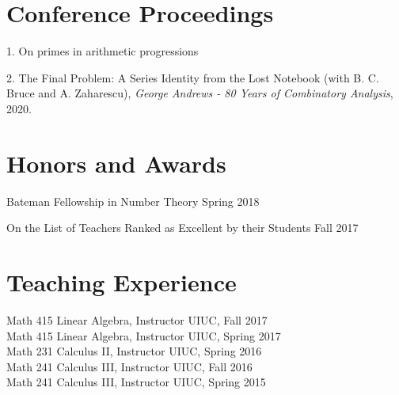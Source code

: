 \documentclass[margin,line,pifont,palatino,courier]{res}
\begin{document}
\begin{resume}
\section{\sc Conference Proceedings}
1. {On primes in arithmetic progressions}

2. {The Final Problem: A Series Identity from the Lost Notebook} (with B. C. Bruce and A. Zaharescu), {\it George Andrews - 80 Years of Combinatory Analysis}, 2020.

 
 







\section{\sc Honors and Awards}


{Bateman Fellowship in Number Theory} \hfill{Spring 2018}


{On the List of Teachers Ranked as Excellent by their Students} \hfill{Fall 2017}

%
%
%
%
%
%
%


\section{\sc Teaching Experience}
Math 415 Linear Algebra, Instructor {\hfill  UIUC, Fall 2017}\\
Math 415 Linear Algebra, Instructor {\hfill  UIUC, Spring 2017}\\
Math 231 Calculus II, Instructor {\hfill  UIUC, Spring 2016}\\
Math 241 Calculus III, Instructor {\hfill  UIUC, Fall 2016} \\
Math 241 Calculus III, Instructor {\hfill  UIUC, Spring 2015}



\end{resume}
\end{document}

